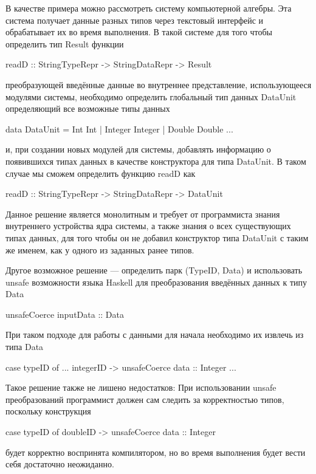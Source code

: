 В качестве примера можно рассмотреть систему компьютерной алгебры. Эта
система получает данные разных типов через текстовый интерфейс и
обрабатывает их во время выполнения. В такой системе для того чтобы
определить тип Result функции
\begin{code}
  readD :: StringTypeRepr -> StringDataRepr -> Result
\end{code}
преобразующей введённые данные во внутреннее представление,
использующееся модулями системы, необходимо определить глобальный тип
данных DataUnit определяющий все возможные типы данных
\begin{code}
data DataUnit = Int Int
              | Integer Integer 
              | Double Double 
              ...
\end{code}
и, при создании новых модулей для системы, добавлять информацию о
появившихся типах данных в качестве конструктора для типа DataUnit. В
таком случае мы сможем определить функцию readD как
\begin{code}
  readD :: StringTypeRepr -> StringDataRepr -> DataUnit
\end{code}

Данное решение является монолитным и требует от программиста знания
внутреннего устройства ядра системы, а также знания о всех
существующих типах данных, для того чтобы он не добавил конструктор
типа DataUnit с таким же именем, как у одного из заданных ранее типов.

Другое возможное решение --- определить парк (TypeID, Data) и
использовать unsafe возможности языка Haskell для преобразования
введённых данных к типу Data
\begin{code}
unsafeCoerce inputData :: Data
\end{code}
При таком подходе для работы с данными для начала необходимо их извлечь из типа Data
\begin{code}
case typeID of
  ...
  integerID -> unsafeCoerce data :: Integer
  ...
\end{code}

Такое решение также не лишено недостатков: При использовании unsafe
преобразований программист должен сам следить за корректностью типов,
поскольку конструкция
\begin{code}
case typeID of
  doubleID -> unsafeCoerce data :: Integer
\end{code}
будет корректно воспринята компилятором, но во время выполнения будет
вести себя достаточно неожиданно.
